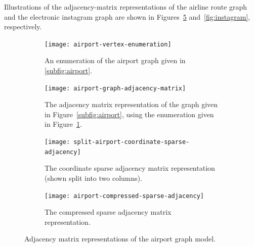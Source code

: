 Illustrations of the adjacency-matrix representations of the airline route graph and the electronic instagram graph are shown in Figures~\ref{fig:airport-representation} and~\ref{fig:instagram}, respectively.

\begin{figure}[tbh]
  \begin{subfigure}[t]{0.175\textwidth}
    \centering
    \texttt{[image: airport-vertex-enumeration]}
    \caption{\label{fig:airport-vertex-enumeration}
    An enumeration of the airport graph given in \protect\ref{subfig:airport}.}
  \end{subfigure}
  \hspace{1em}
  \begin{subfigure}[t]{0.25\textwidth}
    \centering
    \texttt{[image: airport-graph-adjacency-matrix]}
    \caption{\label{fig:airport-graph-adjacency-matrix}
    The adjacency matrix representation of the graph given in Figure~\protect\ref{subfig:airport},
    using the enumeration given in Figure~\protect\ref{fig:airport-vertex-enumeration}.}
  \end{subfigure}
  \hspace{1em}
  \begin{subfigure}[t]{0.175\textwidth}
    \small
    \centering
    \texttt{[image: split-airport-coordinate-sparse-adjacency]}
    \caption{\label{fig:airport-coordinate-sparse-adjacency}
    The coordinate sparse adjacency matrix representation (shown split into two columns).}
  \end{subfigure}
  \hspace{1em}
  \begin{subfigure}[t]{0.3\textwidth}
    \small
    \centering
    \texttt{[image: airport-compressed-sparse-adjacency]}
    \caption{\label{fig:airport-compressed-sparse-adjacency}
    The compressed sparse adjacency matrix representation.}
  \end{subfigure}
  \caption{Adjacency matrix representations of the airport graph model.\label{fig:airport-representation}}
\end{figure}



